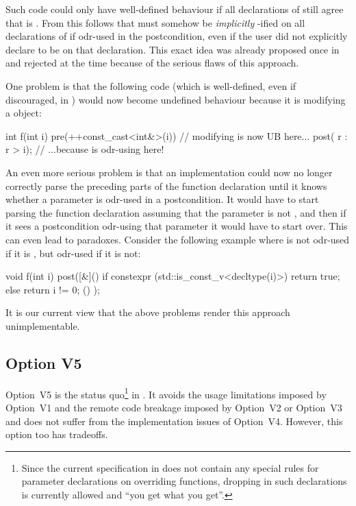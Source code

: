 Such code could only have well-defined behaviour if all declarations of  still agree that  is . From this follows that  must somehow be \emph{implicitly} -ified on all declarations of  if odr-used in the postcondition, even if the user did not explicitly declare  to be  on that declaration. This exact idea was already proposed once in \cite{P2829R0} and rejected at the time because of the serious flaws of this approach.

One problem is that the following code (which is well-defined, even if discouraged, in \cite{P2900R10}) would now become undefined behaviour because it is modifying a  object:

\begin{codeblock}
int f(int i) 
  pre(++const_cast<int&>(i))  // modifying  is now UB here...
  post( r : r > i);  // ...because  is odr-using  here!
\end{codeblock}

An even more serious problem is that an implementation could now no longer correctly parse the preceding parts of the function declaration until it knows whether a parameter is odr-used in a postcondition. It would have to start parsing the function declaration assuming that the parameter is not , and then if it sees a postcondition odr-using that parameter it would have to start over. This can even lead to paradoxes. Consider the following example where  is not odr-used if it is , but odr-used if it is not:
\begin{codeblock}
void f(int i)
  post([&]() {
    if constexpr (std::is_const_v<decltype(i)>) {
      return true; 
    } else {
      return i != 0;
    }
  }() );
\end{codeblock}

It is our current view that the above problems render this approach unimplementable. 



\subsection*{Option V5}

Option~V5 is the status quo\footnote{Since the current specification in \cite{P2900R10} does not contain any special rules for parameter declarations on overriding functions, dropping  in such declarations is currently allowed and ``you get what you get''.} in \cite{P2900R10}. It avoids the usage limitations imposed by Option~V1 and the remote code breakage imposed by Option~V2 or Option~V3 and does not suffer from the implementation issues of Option~V4. However, this option too has tradeoffs.

